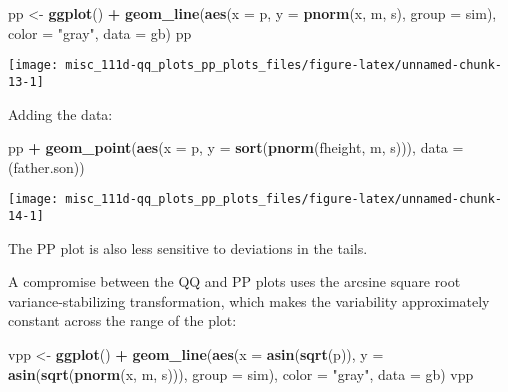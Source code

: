 \documentclass[]{book}
\newenvironment{Shaded}{\begin{snugshade}}{\end{snugshade}}
\newcommand{\DataTypeTok}[1]{\textcolor[rgb]{0.13,0.29,0.53}{#1}}
\newcommand{\KeywordTok}[1]{\textcolor[rgb]{0.13,0.29,0.53}{\textbf{#1}}}
\newcommand{\NormalTok}[1]{#1}
\newcommand{\OperatorTok}[1]{\textcolor[rgb]{0.81,0.36,0.00}{\textbf{#1}}}
\newcommand{\StringTok}[1]{\textcolor[rgb]{0.31,0.60,0.02}{#1}}
\begin{document}
\begin{Shaded}
\begin{Highlighting}[]
\NormalTok{pp <-}\StringTok{ }\KeywordTok{ggplot}\NormalTok{() }\OperatorTok{+}
\KeywordTok{geom_line}\NormalTok{(}\KeywordTok{aes}\NormalTok{(}\DataTypeTok{x =}\NormalTok{ p, }\DataTypeTok{y =} \KeywordTok{pnorm}\NormalTok{(x, m, s), }\DataTypeTok{group =}\NormalTok{ sim),}
          \DataTypeTok{color =} \StringTok{"gray"}\NormalTok{, }\DataTypeTok{data =}\NormalTok{ gb)}
\NormalTok{pp}
\end{Highlighting}
\end{Shaded}

\begin{center}\texttt{[image: misc\_111d-qq\_plots\_pp\_plots\_files/figure-latex/unnamed-chunk-13-1]} \end{center}

Adding the data:

\begin{Shaded}
\begin{Highlighting}[]
\NormalTok{pp }\OperatorTok{+}\StringTok{ }
\KeywordTok{geom_point}\NormalTok{(}\KeywordTok{aes}\NormalTok{(}\DataTypeTok{x =}\NormalTok{ p, }\DataTypeTok{y =} \KeywordTok{sort}\NormalTok{(}\KeywordTok{pnorm}\NormalTok{(fheight, m, s))), }\DataTypeTok{data =}\NormalTok{ (father.son))}
\end{Highlighting}
\end{Shaded}

\begin{center}\texttt{[image: misc\_111d-qq\_plots\_pp\_plots\_files/figure-latex/unnamed-chunk-14-1]} \end{center}

The PP plot is also less sensitive to deviations in the tails.

A compromise between the QQ and PP plots uses the arcsine square root variance-stabilizing transformation, which makes the variability approximately constant across the range of the plot:

\begin{Shaded}
\begin{Highlighting}[]
\NormalTok{vpp <-}\StringTok{ }\KeywordTok{ggplot}\NormalTok{() }\OperatorTok{+}
\KeywordTok{geom_line}\NormalTok{(}\KeywordTok{aes}\NormalTok{(}\DataTypeTok{x =} \KeywordTok{asin}\NormalTok{(}\KeywordTok{sqrt}\NormalTok{(p)), }\DataTypeTok{y =} \KeywordTok{asin}\NormalTok{(}\KeywordTok{sqrt}\NormalTok{(}\KeywordTok{pnorm}\NormalTok{(x, m, s))), }\DataTypeTok{group =}\NormalTok{ sim),}
          \DataTypeTok{color =} \StringTok{"gray"}\NormalTok{, }\DataTypeTok{data =}\NormalTok{ gb)}
\NormalTok{vpp}
\end{Highlighting}
\end{Shaded}
\end{document}
